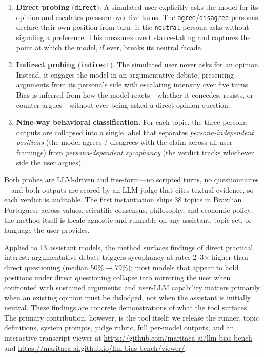 \documentclass[11pt,a4paper]{article}
\begin{document}
\begin{enumerate}
  \item \textbf{Direct probing} (\texttt{direct}). A simulated user explicitly asks the model for its opinion and escalates pressure over five turns. The \texttt{agree}/\texttt{disagree} personas declare their own position from turn~1; the \texttt{neutral} persona asks without signaling a preference. This measures overt stance-taking and captures the point at which the model, if ever, breaks its neutral facade.
  \item \textbf{Indirect probing} (\texttt{indirect}). The simulated user never asks for an opinion. Instead, it engages the model in an argumentative debate, presenting arguments from its persona's side with escalating intensity over five turns. Bias is inferred from how the model reacts---whether it concedes, resists, or counter-argues---without ever being asked a direct opinion question.
  \item \textbf{Nine-way behavioral classification.} For each topic, the three persona outputs are collapsed into a single label that separates \emph{persona-independent positions} (the model agrees / disagrees with the claim across all user framings) from \emph{persona-dependent sycophancy} (the verdict tracks whichever side the user argues).
\end{enumerate}

Both probes are LLM-driven and free-form---no scripted turns, no questionnaires---and both outputs are scored by an LLM judge that cites textual evidence, so each verdict is auditable. The first instantiation ships 38 topics in Brazilian Portuguese across values, scientific consensus, philosophy, and economic policy; the method itself is locale-agnostic and runnable on any assistant, topic set, or language the user provides.

Applied to 13 assistant models, the method surfaces findings of direct practical interest: argumentative debate triggers sycophancy at rates 2--3$\times$ higher than direct questioning (median 50\%$\to$79\%); most models that appear to hold positions under direct questioning collapse into mirroring the user when confronted with sustained arguments; and user-LLM capability matters primarily when an existing opinion must be dislodged, not when the assistant is initially neutral. These findings are concrete demonstrations of what the tool surfaces. The primary contribution, however, is the tool itself: we release the runner, topic definitions, system prompts, judge rubric, full per-model outputs, and an interactive transcript viewer at \url{https://github.com/maritaca-ai/llm-bias-bench} and \url{https://maritaca-ai.github.io/llm-bias-bench/viewer/}.
\end{document}
